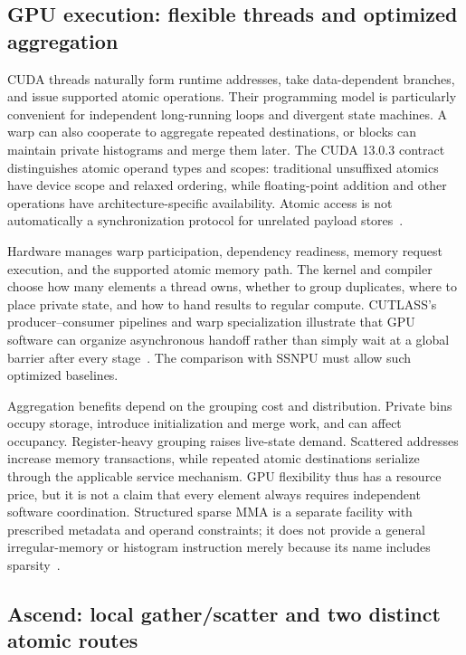 \subsection{GPU execution: flexible threads and optimized aggregation}

CUDA threads naturally form runtime addresses, take data-dependent branches, and issue supported atomic operations. Their programming model is particularly convenient for independent long-running loops and divergent state machines. A warp can also cooperate to aggregate repeated destinations, or blocks can maintain private histograms and merge them later. The CUDA 13.0.3 contract distinguishes atomic operand types and scopes: traditional unsuffixed atomics have device scope and relaxed ordering, while floating-point addition and other operations have architecture-specific availability. Atomic access is not automatically a synchronization protocol for unrelated payload stores~\citep{u004_cuda}.

Hardware manages warp participation, dependency readiness, memory request execution, and the supported atomic memory path. The kernel and compiler choose how many elements a thread owns, whether to group duplicates, where to place private state, and how to hand results to regular compute. CUTLASS's producer--consumer pipelines and warp specialization illustrate that GPU software can organize asynchronous handoff rather than simply wait at a global barrier after every stage~\citep{u004_cutlass_pipeline}. The comparison with SSNPU must allow such optimized baselines.

Aggregation benefits depend on the grouping cost and distribution. Private bins occupy storage, introduce initialization and merge work, and can affect occupancy. Register-heavy grouping raises live-state demand. Scattered addresses increase memory transactions, while repeated atomic destinations serialize through the applicable service mechanism. GPU flexibility thus has a resource price, but it is not a claim that every element always requires independent software coordination. Structured sparse MMA is a separate facility with prescribed metadata and operand constraints; it does not provide a general irregular-memory or histogram instruction merely because its name includes sparsity~\citep{u004_ptx_sparse}.

\subsection{Ascend: local gather/scatter and two distinct atomic routes}

